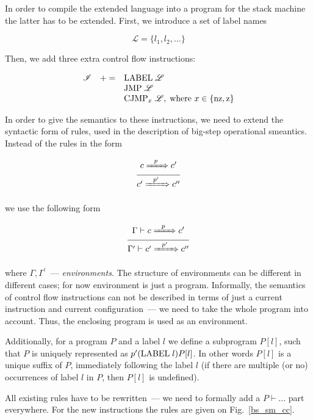 \documentclass{article}
\def\transarrow{\xrightarrow}
\newcommand{\setarrow}[1]{\def\transarrow{#1}}
\def\padding{\phantom{X}}
\newcommand{\trule}[2]{\frac{#1}{#2}}
\newcommand{\withenv}[2]{{#1}\vdash{#2}}
\newcommand{\trans}[3]{{#1}\transarrow{\padding#2\padding}{#3}}
\newcommand{\llang}[1]{\mbox{\lstinline[mathescape]|#1|}}
\theoremstyle{definition}
\begin{document}
In order to compile the extended language into a program for the stack machine the latter has to be extended. First, we introduce a set of label names

\[
\mathscr L = \{l_1, l_2, \dots\}
\]

Then, we add three extra control flow instructions:

\[
\begin{array}{rcl}
  \mathscr I & += & \llang{LABEL $\;\mathscr L$} \\
             &   & \llang{JMP $\;\mathscr L$} \\
  &   & \llang{CJMP$_x$ $\;\mathscr L$},\;\mbox{where $x\in\{\llang{nz}, \llang{z}\}$}
\end{array}
\]

In order to give the semantics to these instructions, we need to extend the syntactic form of rules, used in the description of big-step operational smeantics. Instead of
the rules in the form

\setarrow{\xRightarrow}

\[
\trule{\trans{c}{p}{c^\prime}}{\trans{c^\prime}{p^\prime}{c^{\prime\prime}}}
\]

we use the following form

\[
\trule{\withenv{\Gamma}{\trans{c}{p}{c^\prime}}}{\withenv{\Gamma^\prime}{\trans{c^\prime}{p^\prime}{c^{\prime\prime}}}}
\]

where $\Gamma, \Gamma^\prime$~--- \emph{environments}. The structure of environments can be different in different cases; for now environment is just a program. Informally,
the semantics of control flow instructions can not be described in terms of just a current instruction and current configuration~--- we need to take the whole
program into account. Thus, the enclosing program is used as an environment.

Additionally, for a program $P$ and a label $l$ we define a subprogram $P[l]$, such that $P$ is uniquely represented as $p^\prime(\llang{LABEL $\;l$})P[l]$.
In other words $P[l]$ is a unique suffix of $P$, immediately following the label $l$ (if there are multiple (or no) occurrences of label $l$ in $P$, then $P[l]$ is
undefined).

All existing rules have to be rewritten~--- we need to formally add a $\withenv{P}{\dots}$ part everywhere. For the new instructions the rules are given on Fig.~\ref{bs_sm_cc}.
\end{document}
